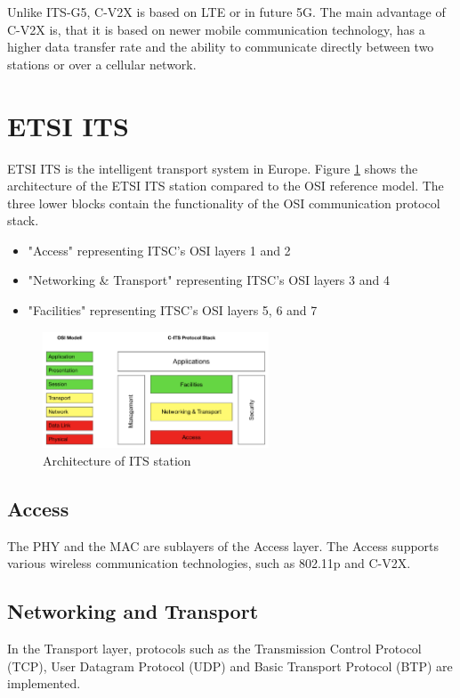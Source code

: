 Unlike ITS-G5, C-V2X is based on LTE or in future 5G. The main advantage of C-V2X is, that it is based on newer mobile communication technology, has a higher data transfer rate and the ability to communicate directly between two stations or over a cellular network. \cite{CV2X}

\section{ETSI ITS}

ETSI ITS is the intelligent transport system in Europe. Figure \ref{fig:OSI_Model} shows the architecture of the ETSI ITS station compared to the OSI reference model. The three lower blocks contain the functionality of the OSI communication protocol stack. \cite{ETSI_EN_302_665}
\begin{itemize}
	\item "Access" representing ITSC's OSI layers 1 and 2
	\item "Networking \& Transport" representing ITSC's OSI layers 3 and 4
	\item "Facilities" representing ITSC's OSI layers 5, 6 and 7
\end{itemize}
 
\begin{figure}[htb]
	\centering
	\includegraphics[width=0.6\textwidth]{images/OSI_Model}
	\caption{Architecture of ITS station}
	\label{fig:OSI_Model}
\end{figure}

\subsection{Access}
The PHY and the MAC are sublayers of the Access layer. The Access supports various wireless communication technologies, such as 802.11p and C-V2X.

\subsection{Networking and Transport}
In the Transport layer, protocols such as the Transmission Control Protocol (TCP), User Datagram Protocol (UDP) and Basic Transport Protocol (BTP) are implemented.

